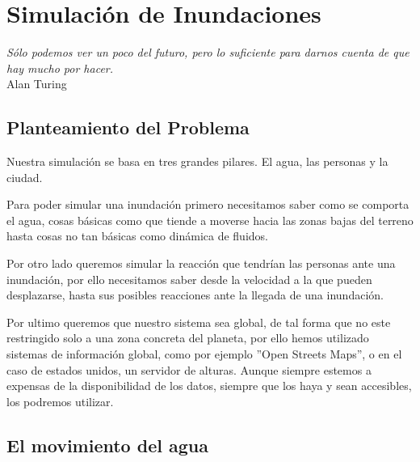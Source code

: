 
\chapter*{Simulación de Inundaciones} \label{cap2}


\begin{flushright}
\begin{minipage}{7.85cm}
    {\em Sólo podemos ver un poco del futuro, pero lo suficiente para darnos
    cuenta de que hay mucho por hacer.} \\  Alan Turing
\end{minipage}
\end{flushright}

\vspace*{5mm}

\section*{Planteamiento del Problema}

Nuestra simulación se basa en tres grandes pilares. El agua, las personas y la
ciudad. 

Para poder simular una inundación\cite{simulator} primero necesitamos saber
como se comporta el
agua, cosas básicas como que tiende a moverse hacia las zonas bajas del terreno
hasta cosas no tan básicas como dinámica de fluidos.

Por otro lado queremos simular la reacción que tendrían las personas ante una
inundación, por ello necesitamos saber desde la velocidad a la que pueden
desplazarse, hasta sus posibles reacciones ante la llegada de una inundación.

Por ultimo queremos que nuestro sistema sea global, de tal forma que no este
restringido solo a una zona concreta del planeta, por ello hemos utilizado
sistemas de información global, como por ejemplo ''Open Streets Maps'', o en
el caso de estados unidos, un servidor de alturas. Aunque siempre estemos a
expensas de la disponibilidad de los datos, siempre que los haya y sean
accesibles, los podremos utilizar.

\section*{El movimiento del agua}

